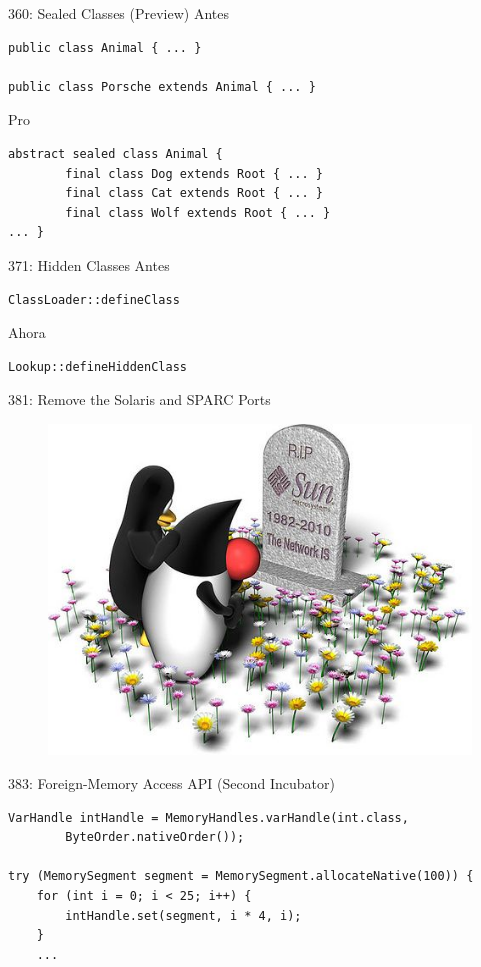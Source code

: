 \documentclass[aspectratio=169]{beamer}
\begin{document}
\begin{frame}[fragile]{360:	Sealed Classes (Preview)}
Antes
\begin{lstlisting}
public class Animal { ... }

public class Porsche extends Animal { ... }
\end{lstlisting}	

Pro
\begin{lstlisting}
abstract sealed class Animal {
        final class Dog extends Root { ... }
        final class Cat extends Root { ... }
        final class Wolf extends Root { ... }
... }
\end{lstlisting}	
\end{frame}


\begin{frame}[fragile]{371:	Hidden Classes}
Antes
\begin{lstlisting}
ClassLoader::defineClass
\end{lstlisting}	

Ahora
\begin{lstlisting}
Lookup::defineHiddenClass
\end{lstlisting}	
\end{frame}


\begin{frame}[fragile]{381:	Remove the Solaris and SPARC Ports}

\begin{figure}
\centering
\includegraphics[width=0.7\linewidth]{Images/sun}
\caption{}
\label{fig:sun}
\end{figure}

\end{frame}

\begin{frame}[fragile]{383:	Foreign-Memory Access API (Second Incubator)}

\begin{lstlisting}
VarHandle intHandle = MemoryHandles.varHandle(int.class,
        ByteOrder.nativeOrder());

try (MemorySegment segment = MemorySegment.allocateNative(100)) {
    for (int i = 0; i < 25; i++) {
        intHandle.set(segment, i * 4, i);
    }
    ...
\end{lstlisting}	
\end{frame}
\end{document}
